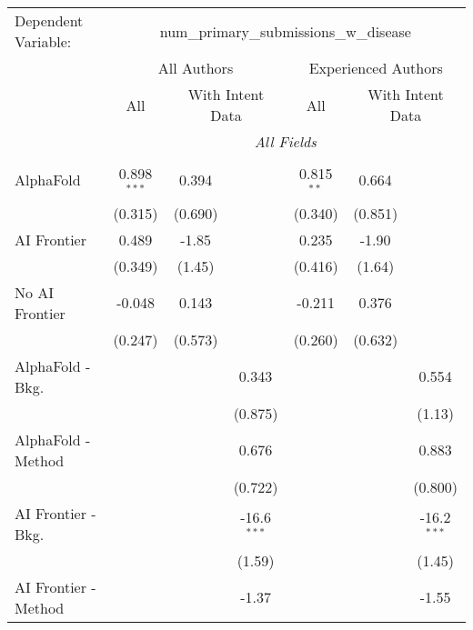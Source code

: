 \begingroup
\centering
\begin{tabular}{lcccccc}
   \tabularnewline \midrule \midrule
   Dependent Variable: & \multicolumn{6}{c}{num\_primary\_submissions\_w\_disease}\\
 & \multicolumn{3}{c}{All Authors} & \multicolumn{3}{c}{Experienced Authors} \\
\cmidrule(lr){2-4} \cmidrule(lr){5-7}
 & \multicolumn{1}{c}{All} & \multicolumn{2}{c}{With Intent Data} & \multicolumn{1}{c}{All} & \multicolumn{2}{c}{With Intent Data} \\
\cmidrule(lr){2-2} \cmidrule(lr){3-4} \cmidrule(lr){5-5} \cmidrule(lr){6-7}
 & \multicolumn{6}{c}{\textit{All Fields}} \\ \\
   AlphaFold               & 0.898$^{***}$ & 0.394   &               & 0.815$^{**}$ & 0.664   &   \\   
                           & (0.315)       & (0.690) &               & (0.340)      & (0.851) &   \\   
   AI Frontier             & 0.489         & -1.85   &               & 0.235        & -1.90   &   \\   
                           & (0.349)       & (1.45)  &               & (0.416)      & (1.64)  &   \\   
   No AI Frontier          & -0.048        & 0.143   &               & -0.211       & 0.376   &   \\   
                           & (0.247)       & (0.573) &               & (0.260)      & (0.632) &   \\   
   AlphaFold - Bkg.        &               &         & 0.343         &              &         & 0.554\\   
                           &               &         & (0.875)       &              &         & (1.13)\\   
   AlphaFold - Method      &               &         & 0.676         &              &         & 0.883\\   
                           &               &         & (0.722)       &              &         & (0.800)\\   
   AI Frontier - Bkg.      &               &         & -16.6$^{***}$ &              &         & -16.2$^{***}$\\   
                           &               &         & (1.59)        &              &         & (1.45)\\   
   AI Frontier - Method    &               &         & -1.37         &              &         & -1.55\\   

\end{tabular}
